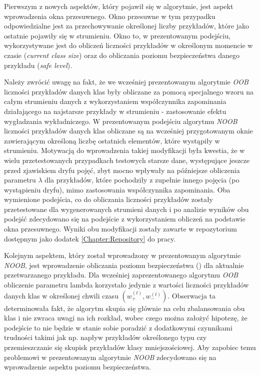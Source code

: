 \noindent Pierwszym z nowych aspektów, który pojawił się w algorytmie, jest aspekt wprowadzenia okna przesuwnego. Okno przesuwne w tym przypadku odpowiedzialne jest za przechowywanie określonej liczby przykładów, które jako ostatnie pojawiły się w strumieniu. Okno to, w prezentowanym podejściu, wykorzystywane jest do obliczeń liczności przykładów w określonym momencie w czasie (\textit{current class size}) oraz do obliczania poziomu bezpieczeństwa danego przykładu (\textit{safe level}).

Należy zwrócić uwagę na fakt, że we wcześniej prezentowanym algorytmie \textit{OOB} liczności przykładów danych klas były obliczane za pomocą specjalnego wzoru na całym strumieniu danych z wykorzystaniem współczynnika zapominania działającego na najstarsze przykłady w strumieniu - zastosowanie efektu wygładzania wykładniczego. W prezentowanym podejściu algorytmu \textit{NOOB} liczności przykładów danych klas obliczane są na wcześniej przygotowanym oknie zawierającym określoną liczbę ostatnich elementów, które wystąpiły w strumieniu. Motywacją do wprowadzenia takiej modyfikacji była kwestia, że w wielu przetestowanych przypadkach testowych starsze dane, występujące jeszcze przed zjawiskiem dryfu pojęć, zbyt mocno wpływały na późniejsze obliczenia parametru $\lambda$ dla przykładów, które pochodziły z zupełnie innego pojęcia (po wystąpieniu dryfu), mimo zastosowania współczynnika zapominania. Oba wymienione podejścia, co do obliczania liczności przykładów zostały przetestowane dla wygenerowanych strumieni danych i po analizie wyników obu podejść zdecydowano się na podejście z wykorzystaniem obliczeń na podstawie okna przesuwnego. Wyniki obu modyfikacji zostały zawarte w repozytorium dostępnym jako dodatek \ref{Chapter:Repository} do pracy.

Kolejnym aspektem, który został wprowadzony w prezentowanym algorytmie \textit{NOOB}, jest wprowadzenie obliczania poziomu bezpieczeństwa () dla aktualnie przetwarzanego przykładu. Dla wcześniej zaprezentowanego algorytmu \textit{OOB} obliczenie parametru lambda korzystało jedynie z wartości liczności przykładów danych klas w określonej chwili czasu $(w^{(t)}_{+}, w^{(t)}_{-})$. Obserwacja ta determinowała fakt, że algorytm skupia się głównie na celu zbalansowania obu klas i nie zwraca uwagi na ich rozkład, wobec czego można założyć hipotezę, że podejście to nie będzie w stanie sobie poradzić z dodatkowymi czynnikami trudności takimi jak np. napływ przykładów określonego typu czy przemieszczanie się skupisk przykładów klasy mniejszościowej. Aby zapobiec temu problemowi w prezentowanym algorytmie \textit{NOOB} zdecydowano się na wprowadzenie aspektu poziomu bezpieczeństwa.

